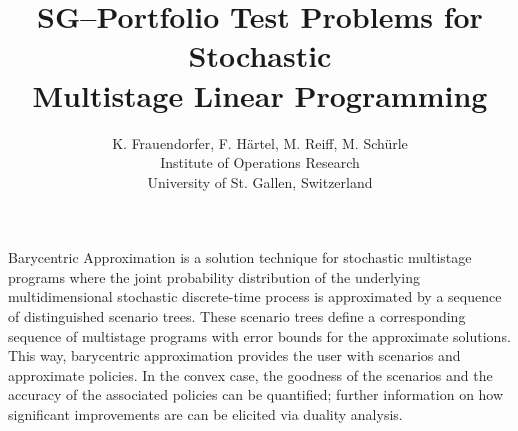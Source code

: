 \newcommand{\theins}[1]{
\begin{theo} \label{#1} \rm }

\newcommand{\thzwei}[2]{
\begin{theo}[#2] \label{#1} \rm }

\newcommand{\eth}{
\end{theo} }

\newcommand{\ko}[1]{
\begin{koro}
\label{#1} \
\rm
}

\newcommand{\eko}{
\end{koro}
}

\newcommand{\bew}{{\noindent\bf Proof:}}
\newcommand{\ebew}{
\vspace*{0.1em}
\hspace*{\fill}\framebox[2mm]{\rule{0mm}{1.1mm}}  %
}





\title{SG--Portfolio Test Problems for Stochastic \\
Multistage Linear Programming }
\author{K. Frauendorfer, F. H\"artel, M. Reiff, M. Sch\"urle \\
\normalsize Institute of Operations Research \\
\normalsize University of St. Gallen, Switzerland \\}
\date{}
\maketitle
\thispagestyle{empty}

\zeilabbig

 Barycentric Approximation is
 a solution technique for stochastic multistage programs 
where the joint probability distribution of the underlying multidimensional 
stochastic discrete-time process is approximated by a sequence of 
distinguished scenario trees. These scenario trees define a corresponding 
sequence of multistage programs 
with error bounds for the approximate solutions. 
This way, barycentric approximation provides the user with 
scenarios and approximate policies. In the
convex case, the goodness of the scenarios and the accuracy of the associated
policies can be quantified; further information on how significant
improvements are can be elicited via duality analysis.

